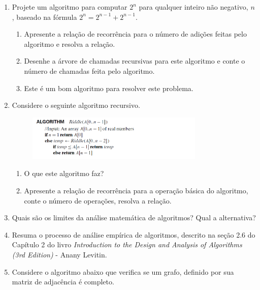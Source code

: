 \documentclass{article}
\begin{document}
\begin{enumerate}
    
    \item Projete um algoritmo para computar $2^n$ para qualquer inteiro não negativo, $n$, baseado na fórmula $2^n = 2^{n-1} + 2^{n-1}$.
    \begin{enumerate}
        \item Apresente a relação de recorrência para o número de adições feitas pelo algoritmo e resolva a relação.
        \item Desenhe a árvore de chamadas recursivas  para este algoritmo e conte o número de chamadas feita pelo algoritmo.
        \item Este é um bom algoritmo para resolver este problema.
    \end{enumerate}
    
    \item Considere o seguinte algoritmo recursivo.
    
    \begin{figure}[!ht]
        \centering
        \includegraphics[width=0.8\textwidth]{alg_a.PNG}
        \label{fig:my_label}
    \end{figure}
    
    \begin{enumerate}
        \item O que este algoritmo faz?
        \item Apresente a relação de recorrência para a operação básica do algoritmo, conte o número de operações, resolva a relação.
    \end{enumerate}
    
    \item Quais são os limites da análise matemática de algoritmos? Qual a alternativa?
    
    \item Resuma o processo de análise empírica de algoritmos, descrito na seção 2.6 do Capítulo 2 do livro \textit{Introduction to the Design and Analysis of Algorithms (3rd Edition)} - Anany Levitin.
    
    \item Considere o algoritmo abaixo que verifica se um grafo, definido por sua matriz de adjacência é completo. 
    

\end{enumerate}
\end{document}
